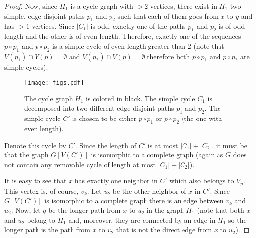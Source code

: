 \documentclass{article}
\theoremstyle{definition}
\begin{document}
\begin{proof}
Now, since $H_{1}$ is a cycle graph with $> 2$ vertices, there exist in $H_{1}$ two simple, edge-disjoint paths $p_{1}$ and $p_{2}$ such that each of them goes from $x$ to $y$ and has $>1$ vertices.
Since $|C_{1}|$ is odd, exactly one of the paths $p_{1}$ and $p_{2}$ is of odd length and the other is of even length.
Therefore, exactly one of the sequences $p \circ p_{1}$ and $p \circ p_{2}$ is a simple cycle of even length greater than $2$
(note that $V(p_1) \cap V(p) = \emptyset$ and $V(p_2) \cap V(p) = \emptyset$ therefore both $p \circ p_{1}$ and $p \circ p_{2}$ are simple cycles).
\begin{figure}[!ht]
	\centering
	\texttt{[image: figs.pdf]}
	\caption{The cycle graph $H_1$ is colored in black. The simple cycle $C_1$ is decomposed into two different edge-disjoint paths $p_1$ and $p_2$. The simple cycle $C'$ is chosen to be either $p \circ p_1$ or $p \circ p_2$ (the one with even length).}
\end{figure}
Denote this cycle by $C'$. Since the length of $C'$ is at most $|C_{1}| + |C_{2}|$, it must be that the graph $G[V(C')]$ is isomorphic to a complete graph (again as $G$ does not contain any removable cycle of length at most $|C_{1}| + |C_{2}|$).

It is easy to see that $x$ has exactly one neighbor in $C'$ which also belongs to $V_{p}$. This vertex is, of course, $v_k$. Let $u_{2}$ be the other neighbor of $x$ in $C'$. Since $G[V(C')]$ is isomorphic to a complete graph there is an edge between $v_k$ and $u_{2}$.
Now, let $q$ be the longer path from $x$ to $u_{2}$ in the graph $H_{1}$ (note that both $x$ and $u_2$ belong to $H_1$ and, moreover, they are connected by an edge in $H_1$ so the longer path is the path from $x$ to $u_2$ that is not the direct edge from $x$ to $u_2$).


\end{proof}
\end{document}
